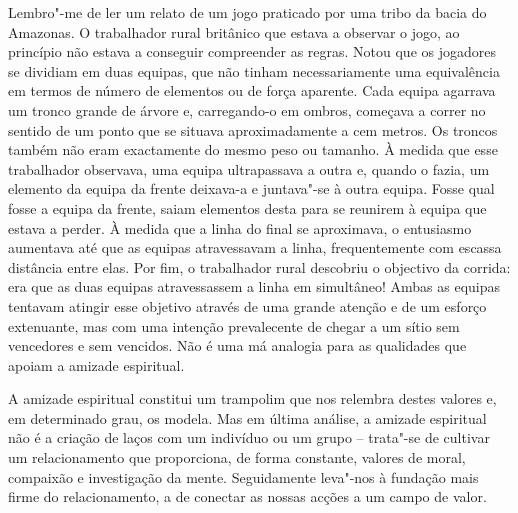 Lembro"-me de ler um relato de um jogo praticado por uma tribo da bacia do
Amazonas. O trabalhador rural britânico que estava a observar o jogo, ao
princípio não estava a conseguir compreender as regras. Notou que os jogadores
se dividiam em duas equipas, que não tinham necessariamente uma equivalência em
termos de número de elementos ou de força aparente. Cada equipa agarrava um
tronco grande de árvore e, carregando-o em ombros, começava a correr no sentido
de um ponto que se situava aproximadamente a cem metros. Os troncos também não
eram exactamente do mesmo peso ou tamanho. À medida que esse trabalhador
observava, uma equipa ultrapassava a outra e, quando o fazia, um elemento da
equipa da frente deixava-a e juntava"-se à outra equipa. Fosse qual fosse a
equipa da frente, saiam elementos desta para se reunirem à equipa que estava a
perder. À medida que a linha do final se aproximava, o entusiasmo aumentava até
que as equipas atravessavam a linha, frequentemente com escassa distância entre
elas. Por fim, o trabalhador rural descobriu o objectivo da corrida: era que as
duas equipas atravessassem a linha em simultâneo! Ambas as equipas tentavam
atingir esse objetivo através de uma grande atenção e de um esforço extenuante,
mas com uma intenção prevalecente de chegar a um sítio sem vencedores e sem
vencidos. Não é uma má analogia para as qualidades que apoiam a amizade
espiritual.

A amizade espiritual constitui um trampolim que nos relembra destes valores e,
em determinado grau, os modela. Mas em última análise, a amizade espiritual não
é a criação de laços com um indivíduo ou um grupo -- trata"-se de cultivar um
relacionamento que proporciona, de forma constante, valores de moral, compaixão
e investigação da mente. Seguidamente leva"-nos à fundação mais firme do
relacionamento, a de conectar as nossas acções a um campo de valor.

